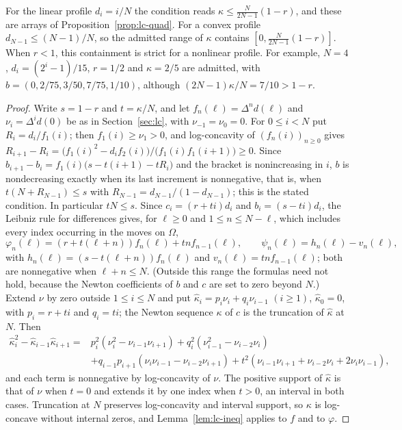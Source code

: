 For the linear profile $d_i=i/N$ the condition reads $\kappa\leq\frac N{2N-1}(1-r)$, and these are arrays of Proposition~\ref{prop:lc-quad}. For a convex profile $d_{N-1}\leq(N-1)/N$, so the admitted range of $\kappa$ contains $[0,\frac N{2N-1}(1-r)]$. When $r<1$, this containment is strict for a nonlinear profile. For example, $N=4$, $d_i=(2^i-1)/15$, $r=1/2$ and $\kappa=2/5$ are admitted, with $b=(0,2/75,3/50,7/75,1/10)$, although $(2N-1)\kappa/N=7/10>1-r$.

\begin{proof}
Write $s=1-r$ and $t=\kappa/N$, and let $f_n(\ell)=\Delta^nd(\ell)$ and $\nu_i=\Delta^id(0)$ be as in Section~\ref{sec:lc}, with $\nu_{-1}=\nu_0=0$. For $0\leq i<N$ put $R_i=d_i/f_1(i)$; then $f_1(i)\geq\nu_1>0$, and log-concavity of $(f_n(i))_{n\geq0}$ gives $R_{i+1}-R_i=\bigl(f_1(i)^2-d_if_2(i)\bigr)/\bigl(f_1(i)f_1(i+1)\bigr)\geq0$. Since $b_{i+1}-b_i=f_1(i)\bigl(s-t(i+1)-tR_i\bigr)$ and the bracket is nonincreasing in $i$, $b$ is nondecreasing exactly when its last increment is nonnegative, that is, when $t(N+R_{N-1})\leq s$ with $R_{N-1}=d_{N-1}/(1-d_{N-1})$; this is the stated condition. In particular $tN\leq s$. Since $c_i=(r+ti)d_i$ and $b_i=(s-ti)d_i$, the Leibniz rule for differences gives, for $\ell\geq0$ and $1\leq n\leq N-\ell$, which includes every index occurring in the moves on $\Omega$,
\[
\varphi_n(\ell)=(r+t(\ell+n))f_n(\ell)+tnf_{n-1}(\ell),\qquad\psi_n(\ell)=h_n(\ell)-v_n(\ell),
\]
with $h_n(\ell)=(s-t(\ell+n))f_n(\ell)$ and $v_n(\ell)=tnf_{n-1}(\ell)$; both are nonnegative when $\ell+n\leq N$. (Outside this range the formulas need not hold, because the Newton coefficients of $b$ and $c$ are set to zero beyond $N$.) Extend $\nu$ by zero outside $1\leq i\leq N$ and put $\widehat\kappa_i=p_i\nu_i+q_i\nu_{i-1}$ $(i\geq1)$, $\widehat\kappa_0=0$, with $p_i=r+ti$ and $q_i=ti$; the Newton sequence $\kappa$ of $c$ is the truncation of $\widehat\kappa$ at $N$. Then
\[
\begin{aligned}
\widehat\kappa_i^2-\widehat\kappa_{i-1}\widehat\kappa_{i+1}={}&p_i^2(\nu_i^2-\nu_{i-1}\nu_{i+1})+q_i^2(\nu_{i-1}^2-\nu_{i-2}\nu_i)\\
&+q_{i-1}p_{i+1}(\nu_i\nu_{i-1}-\nu_{i-2}\nu_{i+1})+t^2(\nu_{i-1}\nu_{i+1}+\nu_{i-2}\nu_i+2\nu_i\nu_{i-1}),
\end{aligned}
\]
and each term is nonnegative by log-concavity of $\nu$. The positive support of $\widehat\kappa$ is that of $\nu$ when $t=0$ and extends it by one index when $t>0$, an interval in both cases. Truncation at $N$ preserves log-concavity and interval support, so $\kappa$ is log-concave without internal zeros, and Lemma~\ref{lem:lc-ineq} applies to $f$ and to $\varphi$.


\end{proof}
